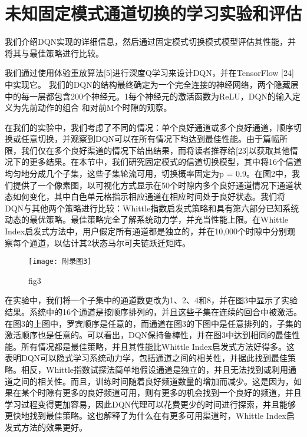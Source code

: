 \section{ 未知固定模式通道切换的学习实验和评估  }
我们介绍DQN实现的详细信息，然后通过固定模式切换模式模型评估其性能，并将其与最佳策略进行比较。

我们通过使用体验重放算法[5]进行深度Q学习来设计DQN，并在TensorFlow [24]中实现它。 我们的DQN的结构最终确定为一个完全连接的神经网络，两个隐藏层中的每一层都包含200个神经元。1每个神经元的激活函数为ReLU，DQN的输入定义为先前动作的组合 和对前M个时隙的观察。

在我们的实验中，我们考虑了不同的情况：单个良好通道或多个良好通道，顺序切换或任意切换，并观察到DQN可以在所有情况下均达到最佳性能。由于篇幅所限，我们仅在多个良好渠道的情况下给出结果，而将读者推荐给[23]以获取其他情况下的更多结果。在本节中，我们研究固定模式的信道切换模型，其中将16个信道均匀地分成几个子集，这些子集轮流可用，切换概率固定为p = 0.9。在图2中，我们提供了一个像素图，以可视化方式显示在50个时隙内多个良好通道情况下通道状态如何变化，其中白色单元格指示相应通道在相应时间处于良好状态。我们将DQN与其他两个策略进行比较：Whittle指数启发式策略和具有第六部分已知系统动态的最优策略。最佳策略完全了解系统动力学，并充当性能上限。在Whittle Index启发式方法中，用户假定所有通道都是独立的，并在10,000个时隙中分别观察每个通道，以估计其2状态马尔可夫链跃迁矩阵。
\begin{figure}[h]
	\centering
	\texttt{[image: 附录图3]}
	\caption{fig3}
\end{figure}

在实验中，我们将一个子集中的通道数更改为1、2、4和8，并在图3中显示了实验结果。系统中的16个通道是按顺序排列的，并且这些子集在连续的回合中被激活。在图3的上图中，罗宾顺序是任意的，而通道在图3的下图中是任意排列的，子集的激活顺序也是任意的。可以看出，DQN保持鲁棒性，并在图3中达到相同的最佳性能。所有情况都是最佳策略，并且其性能比Whittle Index启发式方法好得多。这表明DQN可以隐式学习系统动力学，包括通道之间的相关性，并据此找到最佳策略。相反，Whittle指数试探法简单地假设通道是独立的，并且无法找到或利用通道之间的相关性。而且，训练时间随着良好频道数量的增加而减少。这是因为，如果在某个时隙有更多的良好频道可用，则有更多的机会找到一个良好的频道，并且学习过程变得更加容易，因此DQN代理可以花费更少的时间进行探索，并且能够更快地找到最佳策略。这也解释了为什么在有更多可用渠道时，Whittle Index启发式方法的效果更好。

